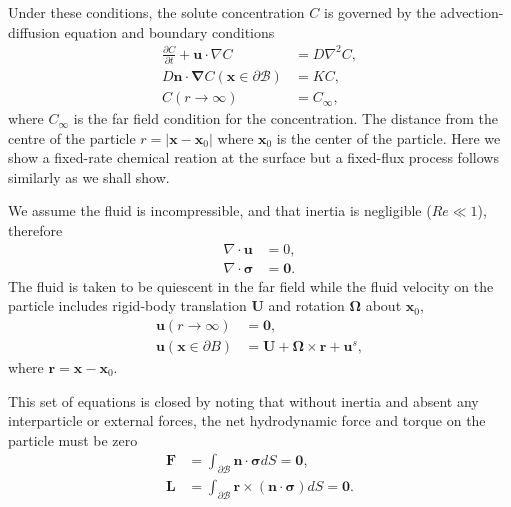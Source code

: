 \documentclass[aps,pre,reprint,twocolumn,notitlepage,superscriptaddress]{revtex4-1}
\begin{document}
Under these conditions, the solute concentration $C$ is governed by the advection-diffusion equation and boundary conditions
\begin{align}
\frac{\partial C}{\partial t} + \boldsymbol{u} \cdot \nabla C &= D \nabla^{2} C,\label{conc}\\
D\boldsymbol{n}\cdot\boldsymbol{\nabla} C (\boldsymbol{x} \in \partial \mathcal{B})&=KC, \label{cocb}\\
C(r\longrightarrow \infty)&=C_{\infty},\label{conbc}
\end{align}
where $ C_{\infty}$ is the far field condition for the concentration. The distance from the centre of the particle $r = \left|\boldsymbol{x}-\boldsymbol{x}_0\right|$ where $\boldsymbol{x}_0$ is the center of the particle. Here we show a fixed-rate chemical reation at the surface but a fixed-flux process follows similarly as we shall show.

We assume the fluid is incompressible, and that inertia is negligible ($Re\ll 1$), therefore 
\begin{align}
\nabla \cdot \boldsymbol{u} &= 0,\label{continuity}\\
\nabla \cdot\boldsymbol{\sigma} &= \boldsymbol{0}.\label{velo}
\end{align}
The fluid is taken to be quiescent in the far field while the fluid velocity on the particle includes rigid-body translation $\boldsymbol{U}$ and rotation $\boldsymbol{\Omega}$ about $\boldsymbol{x}_0$,
\begin{align}
\boldsymbol{u}(r\longrightarrow \infty) &= \boldsymbol{0},\label{uc}\\
\boldsymbol{u}(\boldsymbol{x}\in\partial B) &= \boldsymbol{U}+\boldsymbol{\Omega}\times\boldsymbol{r}+\boldsymbol{u}^s,\label{ub}
\end{align}
where $\boldsymbol{r} = \boldsymbol{x}-\boldsymbol{x}_0$.

This set of equations is closed by noting that without inertia and absent any interparticle or external forces, the net hydrodynamic force and torque on the particle must be zero
\begin{align}
\boldsymbol{F} &= \int_{\partial\mathcal{B}}\boldsymbol{n}\cdot\boldsymbol{\sigma} dS=\boldsymbol{0},\\
\boldsymbol{L} &= \int_{\partial\mathcal{B}}\boldsymbol{r}\times(\boldsymbol{n}\cdot\boldsymbol{\sigma}) dS=\boldsymbol{0}.
\end{align}
\end{document}
